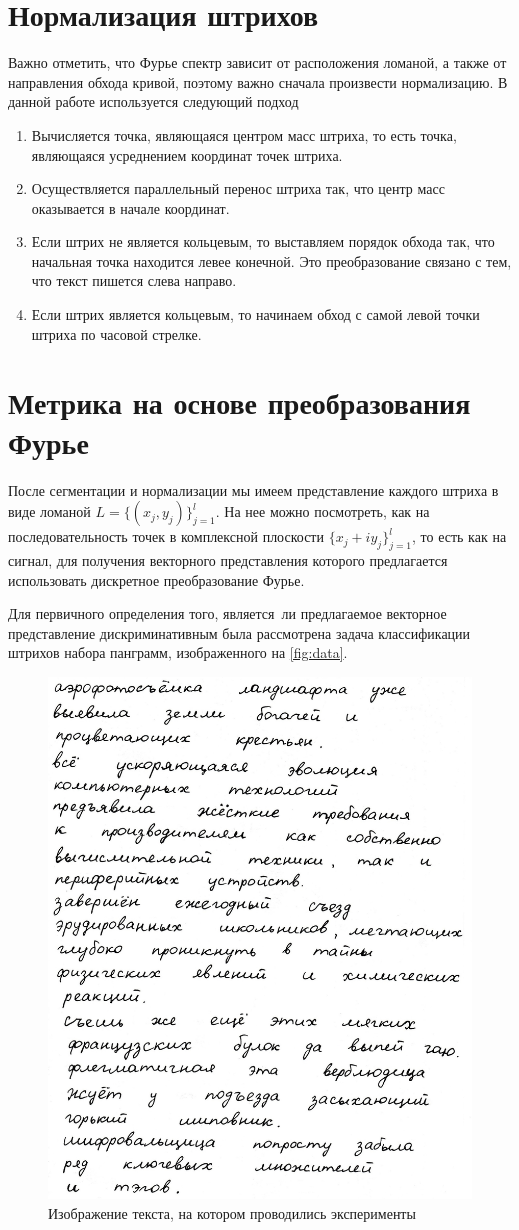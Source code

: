 \documentclass{article}
\begin{document}
\section{Нормализация штрихов}
Важно отметить, что Фурье спектр зависит от расположения ломаной, а также от направления обхода кривой, поэтому важно сначала произвести нормализацию. В данной работе используется следующий подход
\begin{enumerate}
    \item Вычисляется точка, являющаяся центром масс штриха, то есть точка, являющаяся усреднением координат точек штриха.
    \item Осуществляется параллельный перенос штриха так, что центр масс оказывается в начале координат.
    \item Если штрих не является кольцевым, то выставляем порядок обхода так, что начальная точка находится левее конечной. Это преобразование связано с тем, что текст пишется слева направо.
    \item Если штрих является кольцевым, то начинаем обход с самой левой точки штриха по часовой стрелке.
\end{enumerate}
\section{Метрика на основе преобразования Фурье}
После сегментации и нормализации мы имеем представление каждого штриха в виде ломаной $L = \{(x_j, y_j)\}_{j=1}^l$. На нее можно посмотреть, как на последовательность точек в комплексной плоскости $\{x_j + i y_j\}_{j=1}^l$, то есть как на сигнал, для получения векторного представления которого предлагается использовать дискретное преобразование Фурье. 
\par Для первичного определения того, является~ли предлагаемое векторное представление дискриминативным была рассмотрена задача классификации штрихов набора панграмм, изображенного на \autoref{fig:data}.
\begin{figure}[H]
    \centering
    \includegraphics[width=0.3\linewidth]{img/text_my.jpg}
    \caption{Изображение текста, на котором проводились эксперименты}
    \label{fig:data}
\end{figure}
\end{document}
